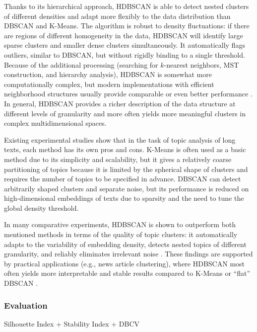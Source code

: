 Thanks to its hierarchical approach, HDBSCAN is able to detect nested clusters of different densities
and adapt more flexibly to the data distribution than DBSCAN and K-Means. The algorithm is robust
to density fluctuations: if there are regions of different homogeneity in the data, HDBSCAN will identify
large sparse clusters and smaller dense clusters simultaneously. It automatically flags outliers, similar
to DBSCAN, but without rigidly binding to a single threshold. Because of the additional processing
(searching for $k$-nearest neighbors, MST construction, and hierarchy analysis), HDBSCAN is somewhat
more computationally complex, but modern implementations with efficient neighborhood structures usually
provide comparable or even better performance \parencite{HDBSCAN2017software}. In general, HDBSCAN
provides a richer description of the data structure at different levels of granularity and more often
yields more meaningful clusters in complex multidimensional spaces.

Existing experimental studies show that in the task of topic analysis of long texts, each method has its
own pros and cons. K-Means is often used as a basic method due to its simplicity and scalability, but
it gives a relatively coarse partitioning of topics because it is limited by the spherical shape
of clusters and requires the number of topics to be specified in advance. DBSCAN can detect arbitrarily
shaped clusters and separate noise, but its performance is reduced on high-dimensional embeddings of texts
due to sparsity and the need to tune the global density threshold.

In many comparative experiments, HDBSCAN is shown to outperform both mentioned methods in terms
of the quality of topic clusters: it automatically adapts to the variability of embedding density, detects
nested topics of different granularity, and reliably eliminates irrelevant noise
\parencite{HDBSCAN2017software, HDBSCAN2013}. These findings are supported by practical applications
(e.g., news article clustering), where HDBSCAN most often yields more interpretable and stable results
compared to K-Means or “flat” DBSCAN \parencite{BERTopic2022}.

\subsubsection{Evaluation}
Silhouette Index + Stability Index + DBCV